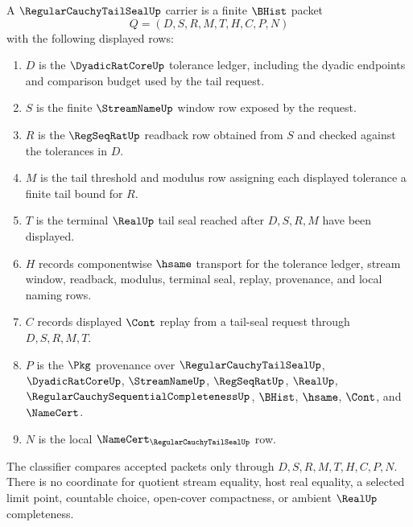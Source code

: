 \begin{definition}
\label{def:regular-cauchy-tail-seal-carrier}
A $\RegularCauchyTailSealUp$ carrier is a finite $\BHist$ packet
$$
Q=(D,S,R,M,T,H,C,P,N)
$$
with the following displayed rows:
\begin{enumerate}
\item $D$ is the $\DyadicRatCoreUp$ tolerance ledger, including the dyadic endpoints and comparison budget used by the tail request.
\item $S$ is the finite $\StreamNameUp$ window row exposed by the request.
\item $R$ is the $\RegSeqRatUp$ readback row obtained from $S$ and checked against the tolerances in $D$.
\item $M$ is the tail threshold and modulus row assigning each displayed tolerance a finite tail bound for $R$.
\item $T$ is the terminal $\RealUp$ tail seal reached after $D,S,R,M$ have been displayed.
\item $H$ records componentwise $\hsame$ transport for the tolerance ledger, stream window, readback, modulus, terminal seal, replay, provenance, and local naming rows.
\item $C$ records displayed $\Cont$ replay from a tail-seal request through $D,S,R,M,T$.
\item $P$ is the $\Pkg$ provenance over $\RegularCauchyTailSealUp$, $\DyadicRatCoreUp$, $\StreamNameUp$, $\RegSeqRatUp$, $\RealUp$, $\RegularCauchySequentialCompletenessUp$, $\BHist$, $\hsame$, $\Cont$, and $\NameCert$.
\item $N$ is the local $\NameCert_{\RegularCauchyTailSealUp}$ row.
\end{enumerate}
The classifier compares accepted packets only through $D,S,R,M,T,H,C,P,N$. There is no coordinate for quotient stream equality, host real equality, a selected limit point, countable choice, open-cover compactness, or ambient $\RealUp$ completeness.
\end{definition}

